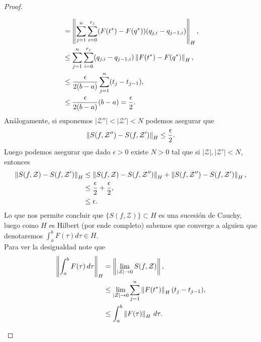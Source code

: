 \begin{proof}
\begin{enumerate}
\begin{align*}
      &=\left\|\sum_{j=1}^{n}\sum_{i=0}^{r_{j}}(F(t^{*})-F(q^{*}))(q_{j,i}-q_{j-1,i})\right\|_{H},\\
      &\leq \sum_{j=1}^{n}\sum_{i=0}^{r_{j}}(q_{j,i}-q_{j-1,i})\left\|F(t^{*})-F(q^{*})\right\|_{H},\\
      &\leq \frac{\epsilon}{2(b-a)} \sum_{j=1}^{n}(t_{j}-t_{j-1}),\\
      &\leq \frac{\epsilon}{2(b-a)} (b-a)=\frac{\epsilon}{2}.
    \end{align*}
    Análogamente, si suponemos $|\mathcal{Z}''|<|\mathcal{Z}'|<N$ podemos asegurar que
    \begin{align*}
      \left\|S(f,\mathcal{Z}'')-S(f,\mathcal{Z}')\right\|_{H}\leq \frac{\epsilon}{2}.
    \end{align*}
    Luego podemos asegurar que dado $\epsilon>0$ existe $N>0$ tal que si $|\mathcal{Z}|,|\mathcal{Z}'|<N$, entonces
    \begin{align*}
      \left\|S(f,\mathcal{Z})-S(f,\mathcal{Z}')\right\|_{H}&\leq\left\|S(f,\mathcal{Z})-S(f,\mathcal{Z}'')\right\|_{H}+\left\|S(f,\mathcal{Z''})-S(f,\mathcal{Z}')\right\|_{H},\\
      &\leq \frac{\epsilon}{2}+\frac{\epsilon}{2},\\
      &\leq \epsilon.
    \end{align*}
    Lo que nos permite concluir que $\{S(f,\mathcal{Z})\}\subset H$ es una sucesión de Cauchy, luego como $H$ es Hilbert (por ende completo) sabemos que converge a alguien que denotaremos $\int_{a}^{b}F(\tau)d\tau\in H$.\\
    Para ver la desigualdad note que
    \begin{align*}
      \left\|\int_{a}^{b}F(\tau)\, d\tau\right\|_{H}&=\left\|\lim_{|\mathcal{Z}| \to 0}S(f,\mathcal{Z})\right\|,\\
      &\leq \lim_{|Z| \to 0}\sum_{j=1}^{n}\left\|F(t^{*})\right\|_{H}(t_{j}-t_{j-1}),\\
      &\leq \int_{a}^{b}\left\|F(\tau)\right\|_{H}\, d\tau.
    \end{align*}
  \end{enumerate}
\end{proof}
